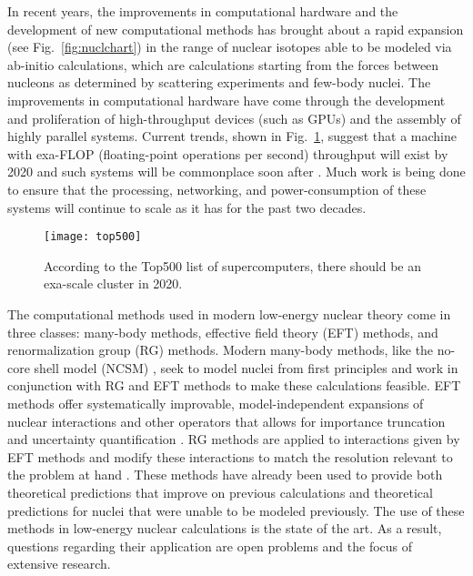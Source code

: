 In recent years, the improvements in computational hardware and the development of new computational methods has brought about a rapid expansion (see Fig.~\ref{fig:nuclchart}) in the range of nuclear isotopes able to be modeled via ab-initio calculations, which are calculations starting from the forces between nucleons as determined by scattering experiments and few-body nuclei. The improvements in computational hardware have come through the development and proliferation of high-throughput devices (such as GPUs) and the assembly of highly parallel systems. Current trends, shown in Fig.~\ref{fig:top500}, suggest that a machine with exa-FLOP (floating-point operations per second) throughput will exist by 2020 and such systems will be commonplace soon after \cite{Top500}. Much work is being done to ensure that the processing, networking, and power-consumption of these systems will continue to scale as it has for the past two decades.

\begin{figure}[t]
    \begin{center}
        \texttt{[image: top500]}
    \end{center}
    \caption{According to the Top500 list of supercomputers, there should be an exa-scale cluster in 2020.}
    \label{fig:top500}
\end{figure}

The computational methods used in modern low-energy nuclear theory come in three classes: many-body methods, effective field theory (EFT) methods, and renormalization group (RG) methods. Modern many-body methods, like the no-core shell model (NCSM) \cite{Barrett:2013nh}, seek to model nuclei from first principles and work in conjunction with RG and EFT methods to make these calculations feasible. EFT methods offer systematically improvable, model-independent expansions of nuclear interactions and other operators that allows for importance truncation and uncertainty quantification \cite{Machleidt:2011zz}\cite{Epelbaum:2008ga}. RG methods are applied to interactions given by EFT methods and modify these interactions to match the resolution relevant to the problem at hand \cite{Bogner:2009bt}. These methods have already been used to provide both theoretical predictions that improve on previous calculations and theoretical predictions for nuclei that were unable to be modeled previously. The use of these methods in low-energy nuclear calculations is the state of the art. As a result, questions regarding their application are open problems and the focus of extensive research. %

